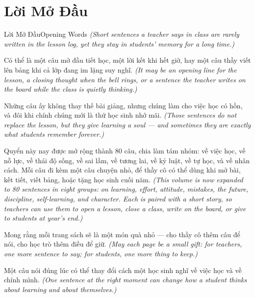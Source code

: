 \chapter*{Lời Mở Đầu}

\begin{truyen}{Lời Mở Đầu}{Opening Words}
\textit{(Short sentences a teacher says in class are rarely written in the lesson log, yet they stay in students' memory for a long time.)}

Có thể là một câu mở đầu tiết học, một lời kết khi hết giờ, hay một câu thầy viết lên bảng khi cả lớp đang im lặng suy nghĩ.
\textit{(It may be an opening line for the lesson, a closing thought when the bell rings, or a sentence the teacher writes on the board while the class is quietly thinking.)}

Những câu ấy không thay thế bài giảng, nhưng chúng làm cho việc học có hồn, và đôi khi chính chúng mới là thứ học sinh nhớ mãi.
\textit{(Those sentences do not replace the lesson, but they give learning a soul — and sometimes they are exactly what students remember forever.)}

Quyển này nay được mở rộng thành 80 câu, chia làm tám nhóm: về việc học, về nỗ lực, về thái độ sống, về sai lầm, về tương lai, về kỷ luật, về tự học, và về nhân cách. Mỗi câu đi kèm một câu chuyện nhỏ, để thầy cô có thể dùng khi mở bài, kết tiết, viết bảng, hoặc tặng học sinh cuối năm.
\textit{(This volume is now expanded to 80 sentences in eight groups: on learning, effort, attitude, mistakes, the future, discipline, self-learning, and character. Each is paired with a short story, so teachers can use them to open a lesson, close a class, write on the board, or give to students at year's end.)}

Mong rằng mỗi trang sách sẽ là một món quà nhỏ — cho thầy cô thêm câu để nói, cho học trò thêm điều để giữ.
\textit{(May each page be a small gift: for teachers, one more sentence to say; for students, one more thing to keep.)}
\end{truyen}

\begin{baihoc}
Một câu nói đúng lúc có thể thay đổi cách một học sinh nghĩ về việc học và về chính mình.
\textit{(One sentence at the right moment can change how a student thinks about learning and about themselves.)}
\end{baihoc}

